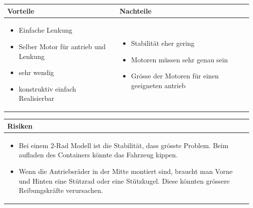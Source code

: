 \begin{table}[h]
\begin{tabular}{p{} | p{}}


 \textbf{Vorteile} & \textbf{Nachteile} \\ \hline
	 
\begin{itemize}
\item Einfache Lenkung
\item Selber Motor für antrieb und Lenkung
\item sehr wendig
\item konstruktiv einfach Realisierbar
\end{itemize}

 
 &
 
\begin{itemize}
\item Stabilität eher gering
\item Motoren müssen sehr genau sein
\item Grösse der Motoren für einen geeigneten antrieb 
\end{itemize}

\end{tabular}
\end{table}

\begin{table}[h]
\begin{tabular}{p{}p{}}


 \textbf{Risiken} & \\ \hline
	 
\begin{itemize}
\item Bei einem 2-Rad Modell ist die Stabilität, dass grösste Problem. Beim aufladen des Containers könnte das Fahrzeug kippen.
\item Wenn die Antriebsräder in der Mitte montiert sind, braucht man Vorne und Hinten eine Stützrad oder eine Stützkugel. Diese könnten grössere Reibungskräfte verursachen.
\end{itemize}

 
\end{tabular}
\end{table}

\pagebreak